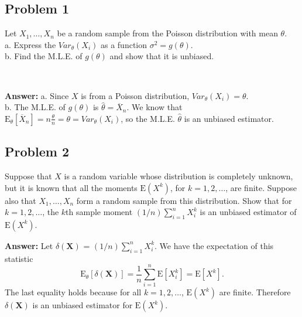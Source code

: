 \documentclass{article}
\begin{document}
\subsection*{Problem 1}
Let $X_1, \dots, X_n$ be a random sample from the Poisson distribution with mean $\theta$. \\
a. Express the $Var_{\theta}(X_i)$ as a function $\sigma^2=g(\theta)$. \\
b. Find the M.L.E. of $g(\theta)$ and show that it is unbiased.

\

\textbf{Answer:} a. Since $X$ is from a Poisson distribution, $Var_{\theta}(X_i) = \theta$. \\
b. The M.L.E. of $g(\theta)$ is $\hat{\theta} = \overline{X}_n$. We know that $\text{E}_{\theta}[\overline{X}_n] = n \frac{\theta}{n} = \theta = Var_{\theta}(X_i)$, so the M.L.E. $\hat{\theta}$ is an unbiased estimator.

\bigskip

\subsection*{Problem 2}
Suppose that $X$ is a random variable whose distribution is completely unknown, but it is known that all the moments $\text{E}(X^k)$, for $k = 1, 2, \dots$, are finite. Suppose also that $X_1, \dots, X_n$ form a random sample from this distribution. Show that for $k = 1, 2, \dots$, the $k$th sample moment $(1/n) \sum^n_{i=1}X_i^k$ is an unbiased estimator of $\text{E}(X^k)$.

\textbf{Answer:} Let $\delta(\mathbf{X})$ = $(1/n) \sum^n_{i=1}X_i^k$. We have the expectation of this statistic
$$\text{E}_{\theta}[\delta(\mathbf{X})] = \frac{1}{n} \sum^n_{i=1} \text{E}[X_i^k] = \text{E}[X^k].$$
The last equality holds because for all $k = 1, 2,  \dots$, $\text{E}(X^k)$ are finite. Therefore $\delta(\mathbf{X})$ is an unbiased estimator for $\text{E}(X^k)$. 
\end{document}
